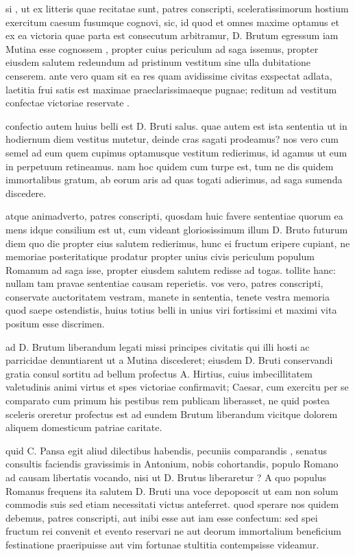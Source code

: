 
 si , ut ex litteris quae recitatae sunt, patres conscripti, sceleratissimorum hostium exercitum caesum fusumque cognovi, sic, id quod et omnes maxime optamus et ex ea victoria quae parta est consecutum arbitramur, D. Brutum egressum iam Mutina esse cognossem , propter cuius periculum ad saga issemus, propter eiusdem salutem redeundum ad pristinum vestitum sine ulla dubitatione censerem. ante vero quam sit ea res quam avidissime civitas exspectat adlata, laetitia frui satis est maximae praeclarissimaeque pugnae; reditum ad vestitum confectae victoriae reservate .

 confectio autem huius belli est D. Bruti salus. quae autem est ista sententia ut in hodiernum diem vestitus mutetur, deinde cras sagati prodeamus? nos vero cum semel ad eum quem cupimus optamusque vestitum redierimus, id agamus ut eum in perpetuum retineamus. nam hoc quidem cum turpe est, tum ne dis quidem immortalibus gratum, ab eorum aris ad quas togati adierimus, ad saga sumenda discedere.

 atque animadverto, patres conscripti, quosdam huic favere sententiae quorum ea mens idque consilium est ut, cum videant gloriosissimum illum D. Bruto futurum diem quo die propter eius salutem redierimus, hunc ei fructum eripere cupiant, ne memoriae posteritatique prodatur propter unius civis periculum populum Romanum ad saga isse, propter eiusdem salutem redisse ad togas. tollite hanc: nullam tam pravae sententiae causam reperietis. vos vero, patres conscripti, conservate auctoritatem vestram, manete in sententia, tenete vestra memoria quod saepe ostendistis, huius totius belli in unius viri fortissimi et maximi vita positum esse discrimen.

 ad D. Brutum liberandum legati missi principes civitatis qui illi hosti ac parricidae denuntiarent ut a Mutina discederet; eiusdem D. Bruti conservandi gratia consul sortitu ad bellum profectus A. Hirtius, cuius imbecillitatem valetudinis animi virtus et spes victoriae confirmavit; Caesar, cum exercitu per se comparato cum primum his pestibus rem publicam liberasset, ne quid postea sceleris oreretur profectus est ad eundem Brutum liberandum vicitque dolorem aliquem domesticum patriae caritate.

 quid C. Pansa egit aliud dilectibus habendis, pecuniis comparandis , senatus consultis faciendis gravissimis in Antonium, nobis cohortandis, populo Romano ad causam libertatis vocando, nisi ut D. Brutus liberaretur ? A quo populus Romanus frequens ita salutem D. Bruti una voce depoposcit ut eam non solum commodis suis sed etiam necessitati victus anteferret. quod sperare nos quidem debemus, patres conscripti, aut inibi esse aut iam esse confectum: sed spei fructum rei convenit et evento reservari ne aut deorum immortalium beneficium festinatione praeripuisse aut vim fortunae stultitia contempsisse videamur.

